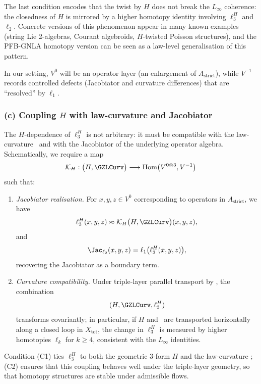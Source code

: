 \documentclass[11pt]{book}
\theoremstyle{plain}
\theoremstyle{definition}
\begin{document}
The last condition encodes that the twist by $H$ does not break the
$L_\infty$ coherence: the closedness of $H$ is mirrored by a higher
homotopy identity involving $\ell_3^H$ and $\ell_2$. Concrete versions
of this phenomenon appear in many known examples (string Lie 2-algebras,
Courant algebroids, $H$-twisted Poisson structures), and the
PFB-GNLA homotopy version can be seen as a law-level generalisation of
this pattern.

In our setting, $V^0$ will be an operator layer (an enlargement of
$A_{\mathrm{strict}}$), while $V^{-1}$ records controlled defects
(Jacobiator and curvature differences) that are “resolved” by
$\ell_1$.



\subsubsection*{(c) Coupling $H$ with law-curvature and Jacobiator}

The $H$-dependence of $\ell_3^H$ is not arbitrary: it must be
compatible with the law-curvature \GZLCurv\ and with the Jacobiator of
the underlying operator algebra. Schematically, we require a map
\[
   \mathcal{K}_H:
     \bigl(H,\GZLCurv\bigr)
     \longrightarrow
     \mathrm{Hom}\bigl(
       V^{0\otimes3},V^{-1}
     \bigr)
\]
such that:

\begin{enumerate}[label=(C\arabic*)]
  \item \emph{Jacobiator realisation.}
        For $x,y,z\in V^0$ corresponding to operators in
        $A_{\mathrm{strict}}$, we have
        \[
           \ell_3^H(x,y,z)
           \approx
           \mathcal{K}_H\bigl(H,\GZLCurv\bigr)(x,y,z),
        \]
        and
        \[
           \Jac_{\ell_2}(x,y,z)
           =
           \ell_1\bigl(\ell_3^H(x,y,z)\bigr),
        \]
        recovering the Jacobiator as a boundary term.
  \item \emph{Curvature compatibility.}
        Under triple-layer parallel transport by \GZTLC, the
        combination
        \[
           (H,\GZLCurv,\ell_3^H)
        \]
        transforms covariantly; in particular, if $H$ and \GZLCurv\ are
        transported horizontally along a closed loop in
        $X_{\mathrm{tot}}$, the change in $\ell_3^H$ is measured by
        higher homotopies $\ell_k$ for $k\ge4$, consistent with the
        $L_\infty$ identities.
\end{enumerate}

Condition (C1) ties $\ell_3^H$ to both the geometric 3-form $H$ and the
law-curvature \GZLCurv; (C2) ensures that this coupling behaves well
under the triple-layer geometry, so that homotopy structures are stable
under admissible flows.
\end{document}
